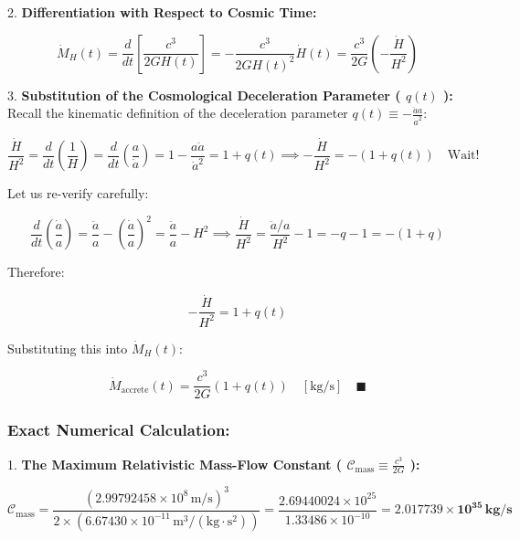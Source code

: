 \documentclass[11pt,a4paper]{article}
\theoremstyle{definition}
\theoremstyle{remark}
\begin{document}
2. \textbf{Differentiation with Respect to Cosmic Time:}


\begin{equation}
\dot{M}_H(t) = \frac{d}{dt}[ \frac{c^3}{2 G H(t)} ] = -\frac{c^3}{2 G H(t)^2} \dot{H}(t) = \frac{c^3}{2 G} \left( -\frac{\dot{H}}{H^2} \right)
\end{equation}


3. \textbf{Substitution of the Cosmological Deceleration Parameter ( $q(t)$ ):}
Recall the kinematic definition of the deceleration parameter $q(t) \equiv -\frac{\ddot{a} a}{\dot{a}^2}$:


\begin{equation}
\frac{\dot{H}}{H^2} = \frac{d}{dt}\left(\frac{1}{H}\right) = \frac{d}{dt}\left(\frac{a}{\dot{a}}\right) = 1 - \frac{a \ddot{a}}{\dot{a}^2} = 1 + q(t) \implies -\frac{\dot{H}}{H^2} = -(1 + q(t)) \quad \text{Wait!}
\end{equation}


Let us re-verify carefully:


\begin{equation}
\frac{d}{dt}\left(\frac{\dot{a}}{a}\right) = \frac{\ddot{a}}{a} - \left(\frac{\dot{a}}{a}\right)^2 = \frac{\ddot{a}}{a} - H^2 \implies \frac{\dot{H}}{H^2} = \frac{\ddot{a}/a}{H^2} - 1 = -q - 1 = -(1 + q)
\end{equation}


Therefore:


\begin{equation}
-\frac{\dot{H}}{H^2} = 1 + q(t)
\end{equation}


Substituting this into $\dot{M}_H(t)$:


\begin{equation}
\boxed{\dot{M}_{\text{accrete}}(t) = \frac{c^3}{2 G} \left( 1 + q(t) \right) \quad [\mathrm{kg/s}] \quad \blacksquare}
\end{equation}


\subsubsection{Exact Numerical Calculation:}
1. \textbf{The Maximum Relativistic Mass-Flow Constant ( $\mathcal{C}_{\text{mass}} \equiv \frac{c^3}{2 G}$ ):}


\begin{equation}
\mathcal{C}_{\text{mass}} = \frac{(2.99792458 \times 10^8 \, \mathrm{m/s})^3}{2 \times (6.67430 \times 10^{-11} \, \mathrm{m^3/(kg \cdot s^2)})} = \frac{2.69440024 \times 10^{25}}{1.33486 \times 10^{-10}} = \mathbf{2.017739 \times 10^{35} \, kg/s}
\end{equation}
\end{document}
